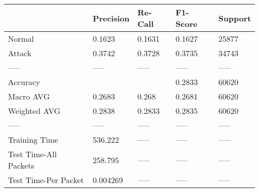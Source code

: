 \begin{tabular}{lllll}
\toprule
{} & Precision & Re-Call & F1-Score & Support \\
\midrule
Normal                &    0.1623 &  0.1631 &   0.1627 &   25877 \\
Attack                &    0.3742 &  0.3728 &   0.3735 &   34743 \\
-----                 &     ----- &   ----- &    ----- &   ----- \\
Accuracy              &           &         &   0.2833 &   60620 \\
Macro AVG             &    0.2683 &   0.268 &   0.2681 &   60620 \\
Weighted AVG          &    0.2838 &  0.2833 &   0.2835 &   60620 \\
-----                 &     ----- &   ----- &    ----- &   ----- \\
Training Time         &   536.222 &   ----- &    ----- &   ----- \\
Test Time-All Packets &   258.795 &   ----- &    ----- &   ----- \\
Test Time-Per Packet  &  0.004269 &   ----- &    ----- &   ----- \\
\bottomrule
\end{tabular}
